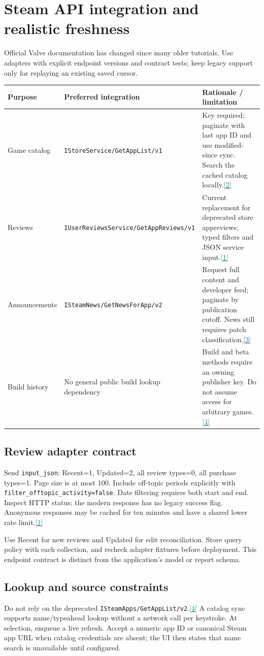 \documentclass[10pt,letterpaper]{article}
\newcommand{\sr}[1]{\hyperlink{src#1}{\textcolor{teal}{[#1]}}}
\newcommand{\nextsection}[1]{\clearpage\section{#1}}
\begin{document}
\nextsection{Steam API integration and realistic freshness}
Official Valve documentation has changed since many older tutorials. Use adapters with explicit endpoint versions and contract tests; keep legacy support only for replaying an existing saved cursor.

\begin{tabularx}{\linewidth}{p{1.1in}YY}
\toprule
Purpose & Preferred integration & Rationale / limitation \\
\midrule
Game catalog & \texttt{IStoreService/GetAppList/v1} & Key required; paginate with last app ID and use modified-since sync. Search the cached catalog locally.\sr{2} \\
Reviews & \texttt{IUserReviewsService/GetAppReviews/v1} & Current replacement for deprecated store appreviews; typed filters and JSON service input.\sr{1} \\
Announcements & \texttt{ISteamNews/GetNewsForApp/v2} & Request full content and developer feed; paginate by publication cutoff. News still requires patch classification.\sr{3} \\
Build history & No general public build lookup dependency & Build and beta methods require an owning publisher key. Do not assume access for arbitrary games.\sr{4} \\
\bottomrule
\end{tabularx}

\subsection{Review adapter contract}
Send \texttt{input\_json}; Recent=1, Updated=2, all review types=0, all purchase types=1. Page size is at most 100. Include off-topic periods explicitly with \texttt{filter\_offtopic\_activity=false}. Date filtering requires both start and end. Inspect HTTP status; the modern response has no legacy success flag. Anonymous responses may be cached for ten minutes and have a shared lower rate limit.\sr{1}

Use Recent for new reviews and Updated for edit reconciliation. Store query policy with each collection, and recheck adapter fixtures before deployment. This endpoint contract is distinct from the application's model or report schema.

\subsection{Lookup and source constraints}
Do not rely on the deprecated \texttt{ISteamApps/GetAppList/v2}.\sr{4} A catalog sync supports name/typeahead lookup without a network call per keystroke. At selection, enqueue a live refresh. Accept a numeric app ID or canonical Steam app URL when catalog credentials are absent; the UI then states that name search is unavailable until configured.
\end{document}
